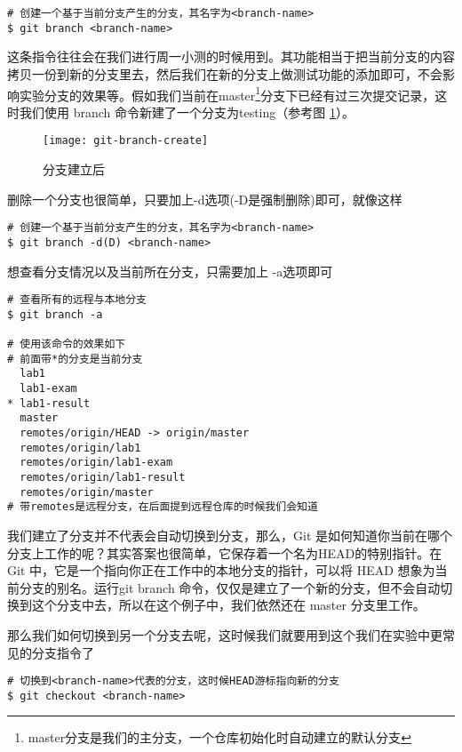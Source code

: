 \begin{verbatim}
# 创建一个基于当前分支产生的分支，其名字为<branch-name>
$ git branch <branch-name>
\end{verbatim}

这条指令往往会在我们进行周一小测的时候用到。其功能相当于把当前分支的内容拷贝一份到新的分支里去，然后我们在新的分支上做测试功能的添加即可，不会影响实验分支的效果等。假如我们当前在master\footnote{master分支是我们的主分支，一个仓库初始化时自动建立的默认分支}分支下已经有过三次提交记录，这时我们使用 branch 命令新建了一个分支为testing（参考图 \ref{git-branch-create}）。

\begin{figure}[htbp]
  \centering
  \texttt{[image: git-branch-create]}
  \caption{分支建立后}\label{git-branch-create}
\end{figure}

删除一个分支也很简单，只要加上-d选项(-D是强制删除)即可，就像这样

\begin{verbatim}
# 创建一个基于当前分支产生的分支，其名字为<branch-name>
$ git branch -d(D) <branch-name>
\end{verbatim}

想查看分支情况以及当前所在分支，只需要加上 -a选项即可

\begin{verbatim}
# 查看所有的远程与本地分支
$ git branch -a

# 使用该命令的效果如下
# 前面带*的分支是当前分支
  lab1
  lab1-exam
* lab1-result
  master
  remotes/origin/HEAD -> origin/master
  remotes/origin/lab1
  remotes/origin/lab1-exam
  remotes/origin/lab1-result
  remotes/origin/master
# 带remotes是远程分支，在后面提到远程仓库的时候我们会知道
\end{verbatim}

我们建立了分支并不代表会自动切换到分支，那么，Git 是如何知道你当前在哪个分支上工作的呢？其实答案也很简单，它保存着一个名为HEAD的特别指针。在 Git 中，它是一个指向你正在工作中的本地分支的指针，可以将 HEAD 想象为当前分支的别名。运行git branch 命令，仅仅是建立了一个新的分支，但不会自动切换到这个分支中去，所以在这个例子中，我们依然还在 master 分支里工作。

那么我们如何切换到另一个分支去呢，这时候我们就要用到这个我们在实验中更常见的分支指令了\label{git checkout}
\begin{verbatim}
# 切换到<branch-name>代表的分支，这时候HEAD游标指向新的分支
$ git checkout <branch-name>
\end{verbatim}

